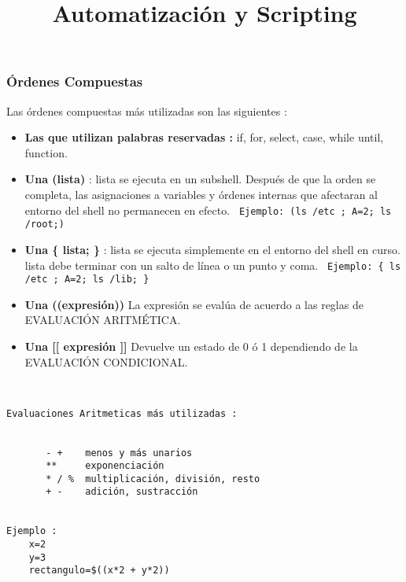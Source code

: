 \documentclass{beamer}
\title{Automatización y Scripting}
\begin{document}
\begin{frame}
  \titlepage

\end{frame}






\begin{frame}{}
\frametitle{Órdenes Compuestas}
Las órdenes compuestas más utilizadas son las siguientes :
\begin{itemize}
\item \textbf{Las que utilizan palabras reservadas : } if, for, select, case, while until, function.
\item \textbf{Una (lista) }: lista  se  ejecuta  en  un subshell. Después de que la orden se completa, las asignaciones a variables y órdenes internas que afectaran al
              entorno del shell no permanecen en efecto.
\texttt{ Ejemplo:  (ls /etc ; A=2; ls /root;) }
\item \textbf{Una \{ lista; \} }: 
              lista se ejecuta simplemente en el entorno del shell en curso.  lista debe terminar con un salto de línea o un punto y  coma.
\texttt{ Ejemplo:  \{ ls /etc ; A=2; ls /lib; \} }
\item
\textbf{Una ((expresión)) } La expresión se evalúa de acuerdo a las reglas de EVALUACIÓN ARITMÉTICA.  
\item
\textbf{Una [[ expresión ]] } Devuelve un estado de 0 ó 1 dependiendo de la EVALUACIÓN CONDICIONAL. 
\end{itemize}
\end{frame}{}



\begin{Verbatim}


Evaluaciones Aritmeticas más utilizadas :


       - +    menos y más unarios
       **     exponenciación
       * / %  multiplicación, división, resto
       + -    adición, sustracción


Ejemplo :
	x=2
	y=3
	rectangulo=$((x*2 + y*2))
\end{Verbatim}
\end{document}
